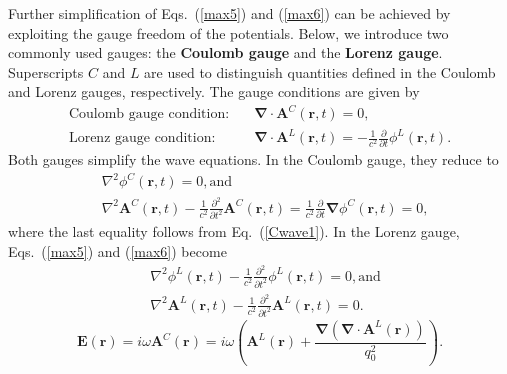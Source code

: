 Further simplification of Eqs.~(\ref{max5}) and (\ref{max6}) can be achieved by exploiting the gauge freedom of the potentials. Below, we introduce two commonly used gauges: the \textbf{Coulomb gauge} and the \textbf{Lorenz gauge}. Superscripts $C$ and $L$ are used to distinguish quantities defined in the Coulomb and Lorenz gauges, respectively. The gauge conditions are given by
\begin{align} 
\text{Coulomb gauge condition}: \quad &\boldsymbol{\nabla}\cdot\boldsymbol{A}^C(\boldsymbol{r}, t)=0,  \label{Ccondition}\\
\text{Lorenz gauge condition}: \quad &\boldsymbol{\nabla}\cdot\boldsymbol{A}^L(\boldsymbol{r}, t)=-\frac{1}{c^2}\frac{\partial }{\partial t}\phi^L(\boldsymbol{r}, t).
\end{align}
Both gauges simplify the wave equations. In the Coulomb gauge, they reduce to
\begin{align} 
&\nabla^2\phi^C(\boldsymbol{r}, t)=0, \text{and} \label{Cwave1}\\
&\nabla^2\boldsymbol{A}^C(\boldsymbol{r}, t)-\frac{1}{c^2}\frac{\partial^2 }{\partial t^2}\boldsymbol{A}^C(\boldsymbol{r}, t)=\frac{1}{c^2}\frac{\partial }{\partial t}\boldsymbol{\nabla}\phi^C(\boldsymbol{r}, t)=0, \label{Cwave2}
\end{align}
where the last equality follows from Eq.~(\ref{Cwave1}).
In the Lorenz gauge, Eqs.~(\ref{max5}) and (\ref{max6}) become
\begin{align} 
&\nabla^2\phi^L(\boldsymbol{r}, t)-\frac{1}{c^2}\frac{\partial^2 }{\partial t^2}\phi^L(\boldsymbol{r}, t)=0, \text{and} \label{Lwave1}\\
&\nabla^2\boldsymbol{A}^L(\boldsymbol{r}, t)-\frac{1}{c^2}\frac{\partial^2 }{\partial t^2}\boldsymbol{A}^L(\boldsymbol{r}, t)=0. \label{Lwave2}
\end{align}
\begin{equation} 
\boldsymbol{E}(\boldsymbol{r})=i\omega\boldsymbol{A}^C(\boldsymbol{r})=
i\omega\left(\boldsymbol{A}^L(\boldsymbol{r})+
\frac{\boldsymbol{\nabla}\left(\boldsymbol{\nabla}\cdot\boldsymbol{A}^L(\boldsymbol{r})\right)}{q_0^2}\right).
\label{LCrelation}
\end{equation}
%
%
%
%
%
%

